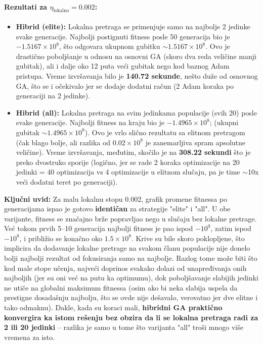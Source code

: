 \documentclass[a4paper,12pt]{article}
\begin{document}
\paragraph{Rezultati za $\eta_{\text{lokalno}} = 0.002$:}
\begin{itemize}
\item \textbf{Hibrid (elite):} Lokalna pretraga se primenjuje samo na najbolje 2 jedinke svake generacije. Najbolji postignuti fitness posle 50 generacija bio je \boldmath$-1.5167 \times 10^8$\unboldmath, što odgovara ukupnom gubitku $\sim 1.5167\times10^8$. Ovo je drastično poboljšanje u odnosu na osnovni GA (skoro dva reda veličine manji gubitak), ali i dalje oko 12 puta veći gubitak nego kod baznog Adam pristupa. Vreme izvršavanja bilo je \textbf{140.72 sekunde}, nešto duže od osnovnog GA, što se i očekivalo jer se dodaje dodatni račun (2 Adam koraka po generaciji na 2 jedinke).
\item \textbf{Hibrid (all):} Lokalna pretraga na svim jedinkama populacije (svih 20) posle svake generacije. Najbolji fitness na kraju bio je \boldmath$-1.4965 \times 10^8$\unboldmath; (ukupni gubitak $\sim 1.4965\times10^8$). Ovo je vrlo slično rezultatu sa elitnom pretragom (čak blago bolje, ali razlika od $0.02\times10^8$ je zanemarljiva spram apsolutne veličine). Vreme izvršavanja, međutim, skočilo je na \textbf{308.22 sekundi} što je preko dvostruko sporije (logično, jer se rade 2 koraka optimizacije na 20 jedinki = 40 optimizacija vs 4 optimizacije u elitnom slučaju, pa je time $\sim$10x veći dodatni teret po generaciji).
\end{itemize}
\textbf{Ključni uvid:} Za malu lokalnu stopu 0.002, grafik promene fitnessa po generacijama ispao je gotovo \textbf{identičan} za strategije "elite" i "all". U obe varijante, fitness se značajno brže popravljao nego u slučaju bez lokalne pretrage. Već tokom prvih 5--10 generacija najbolji fitness je pao ispod $-10^9$, zatim ispod $-10^8$, i približio se konačno oko $1.5\times10^8$. Krive su bile skoro poklopljene, što implicira da dodavanje lokalne pretrage na svakom članu populacije nije donelo bolji najbolji rezultat od fokusiranja samo na najbolje. Razlog tome može biti što kod male stope učenja, najveći doprinos svakako dolazi od unapređivanja onih najboljih (jer su oni već na putu ka optimumu), dok poboljšavanje slabijih jedinki ne utiče na globalni maksimum fitnessa (osim ako bi neka slabija uspela da prestigne dosadašnju najbolju, što se ovde nije dešavalo, verovatno jer dve elitne i tako odmaknu). Dakle, kada su koraci mali, \textbf{hibridni GA praktično konvergira ka istom rešenju bez obzira da li se lokalna pretraga radi za 2 ili 20 jedinki} -- razlika je samo u tome što varijanta "all" troši mnogo više vremena za isto.
\end{document}
